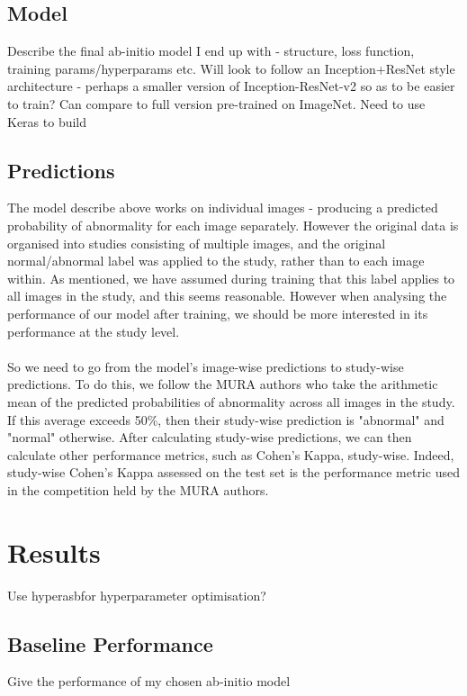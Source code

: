 \documentclass[11pt]{article} %
\theoremstyle{plain}
\theoremstyle{definition}
\begin{document}
\subsection{Model}
Describe the final ab-initio model I end up with - structure, loss function, training params/hyperparams etc. Will look to follow an Inception+ResNet style architecture - perhaps a smaller version of Inception-ResNet-v2 so as to be easier to train? Can compare to full version pre-trained on ImageNet. Need to use Keras to build 

\subsection{Predictions}
The model describe above works on individual images - producing a predicted probability of abnormality for each image separately. However the original data is organised into studies consisting of multiple images, and the original normal/abnormal label was applied to the study, rather than to each image within. As mentioned, we have assumed during training that this label applies to all images in the study, and this seems reasonable. However when analysing the performance of our model after training, we should be more interested in its performance at the study level. 
\\
\\
\noindent
So we need to go from the model's image-wise predictions to study-wise predictions. To do this, we follow the MURA authors \cite{MURA2017} who take the arithmetic mean of the predicted probabilities of abnormality across all images in the study. If this average exceeds 50\%, then their study-wise prediction is "abnormal" and "normal" otherwise. After calculating study-wise predictions, we can then calculate other performance metrics, such as Cohen's Kappa, study-wise. Indeed, study-wise Cohen's Kappa assessed on the test set is the performance metric used in the competition held by the MURA authors.



\newpage
\section{Results}
Use hyperasbfor hyperparameter optimisation? 
\subsection{Baseline Performance}
Give the performance of my chosen ab-initio model
\end{document}
